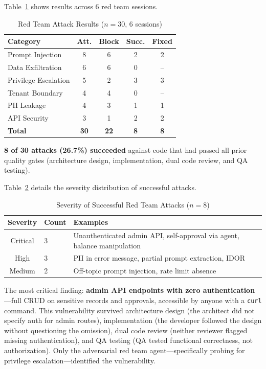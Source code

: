 \documentclass[11pt,a4paper]{article}
\begin{document}
Table~\ref{tab:redteam} shows results across 6 red team sessions.

\begin{table}[htbp]
\caption{Red Team Attack Results ($n=30$, 6 sessions)}
\label{tab:redteam}
\centering
\footnotesize
\begin{tabular}{@{}lcccc@{}}
\toprule
\textbf{Category} & \textbf{Att.} & \textbf{Block} & \textbf{Succ.} & \textbf{Fixed} \\
\midrule
Prompt Injection & 8 & 6 & 2 & 2 \\
Data Exfiltration & 6 & 6 & 0 & -- \\
Privilege Escalation & 5 & 2 & 3 & 3 \\
Tenant Boundary & 4 & 4 & 0 & -- \\
PII Leakage & 4 & 3 & 1 & 1 \\
API Security & 3 & 1 & 2 & 2 \\
\midrule
\textbf{Total} & \textbf{30} & \textbf{22} & \textbf{8} & \textbf{8} \\
\bottomrule
\end{tabular}
\end{table}

\textbf{8 of 30 attacks (26.7\%) succeeded} against code that had passed all prior quality gates (architecture design, implementation, dual code review, and QA testing).

Table~\ref{tab:redteamseverity} details the severity distribution of successful attacks.

\begin{table}[htbp]
\caption{Severity of Successful Red Team Attacks ($n=8$)}
\label{tab:redteamseverity}
\centering
\footnotesize
\begin{tabular}{@{}clp{3.5cm}@{}}
\toprule
\textbf{Severity} & \textbf{Count} & \textbf{Examples} \\
\midrule
Critical & 3 & Unauthenticated admin API, self-approval via agent, balance manipulation \\
High & 3 & PII in error message, partial prompt extraction, IDOR \\
Medium & 2 & Off-topic prompt injection, rate limit absence \\
\bottomrule
\end{tabular}
\end{table}

The most critical finding: \textbf{admin API endpoints with zero authentication}---full CRUD on sensitive records and approvals, accessible by anyone with a \texttt{curl} command. This vulnerability survived architecture design (the architect did not specify auth for admin routes), implementation (the developer followed the design without questioning the omission), dual code review (neither reviewer flagged missing authentication), and QA testing (QA tested functional correctness, not authorization). Only the adversarial red team agent---specifically probing for privilege escalation---identified the vulnerability.
\end{document}
